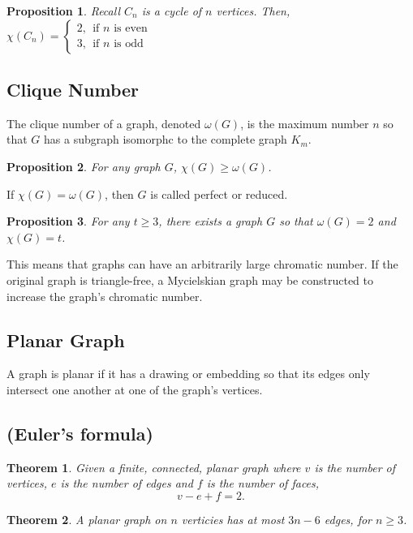 \documentclass{article}
\newtheorem{theorem}{Theorem}[section]
\newtheorem{proposition}{Proposition}[theorem]
\begin{document}
\begin{proposition}
    Recall $C_n$ is a cycle of $n$ vertices. Then, $\chi (C_n) = \begin{cases}
2 ,\ \ \text{if } n \text{ is even} \\
3,\ \  \text{if } n \text{ is odd }
\end{cases}$
\end{proposition}

\subsection{Clique Number}
The clique number of a graph, denoted $\omega(G)$, is the maximum number $n$ so that $G$ has a subgraph isomorphc to the complete graph $K_m$.

\begin{proposition}
    For any graph $G$, $ \chi(G) \geq \omega(G)$.
\end{proposition}

If $ \chi(G) = \omega(G)$, then $G$ is called perfect or reduced.

\begin{proposition}
    For any $t \geq 3$, there exists a graph $G$ so that $\omega(G) = 2$ and $\chi(G) = t$. 
\end{proposition}

This means that graphs can have an arbitrarily large chromatic number. If the original graph is triangle-free, a Mycielskian graph may be constructed to increase the graph's chromatic number.

\subsection{Planar Graph}
A graph is planar if it has a drawing or embedding so that its edges only intersect one another at one of the graph's vertices.


\subsection{(Euler's formula)}
\begin{theorem}
Given a finite, connected, planar graph where $v$ is the number of vertices, $e$ is the number of edges and $f$ is the number of faces,
\[
    v-e+f=2.
\]
\end{theorem}

\begin{theorem}
A planar graph on $n$ verticies has at most $3n-6$ edges, for $n \geq 3$.
\end{theorem}
\end{document}
